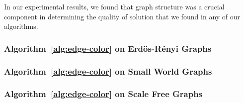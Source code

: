 \label{sec:dimaed-experiments}
In our experimental results, we found that graph structure was a crucial component in determining the quality of solution that we found in any of our algorithms.

\subsubsection{Algorithm~\ref{alg:edge-color} on Erd\"{o}s-R\'{e}nyi Graphs}


\subsubsection{Algorithm~\ref{alg:edge-color} on Small World Graphs}


\subsubsection{Algorithm~\ref{alg:edge-color} on Scale Free Graphs}
\label{sub:experiment:scalefree}

